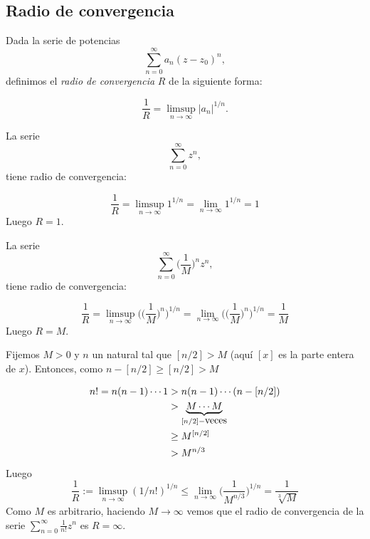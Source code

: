 \subsection{Radio de convergencia}


\begin{definicion}{} Dada la serie de potencias
\[
	\sum\limits_{n=0}^{\infty}a_n(z-z_0)^n,
\]
definimos el \emph{radio de convergencia} $R$ de la siguiente forma:



\[
\frac{1}{R}=\limsup\limits_{n\to \infty} |a_n|^{1/n}.
\]

\end{definicion}

\begin{ejemplo}{} La serie
\[
	\sum\limits_{n=0}^{\infty}z^n,
\]
tiene radio de convergencia:

\[\frac{1}{R}=\limsup\limits_{n\to \infty}1^{1/n}=\lim\limits_{n\to\infty}1^{1/n}=1\]
Luego $R=1$.
\end{ejemplo}

\begin{ejemplo}{} La serie
\[
	\sum\limits_{n=0}^{\infty}\bigg(\frac{1}{M}\bigg)^nz^n,
\]
tiene radio de convergencia:

\[\frac{1}{R}=\limsup\limits_{n\to \infty}\bigg(\bigg(\frac{1}{M}\bigg)^n\bigg)^{1/n}=\lim\limits_{n\to\infty}\bigg(\bigg(\frac{1}{M}\bigg)^n\bigg)^{1/n}=\frac1M\]
Luego $R=M$.

\end{ejemplo}

\begin{ejemplo}{} Fijemos $M>0$ y $n$ un natural tal que $[n/2] >M$ (aquí $[x]$ es la parte entera de $x$). Entonces,
como $n-[n/2]\geq [n/2]>M$

\[
\begin{split}
n!=n(n-1)\cdots 1 &> n(n-1)\cdots (n-[n/2]) \\
&>\underbrace{M\cdots M }_{[n/2]-\hbox{veces}}\\
&\geq M^{[n/2]}\\
&> M^{n/3}\\
\end{split}
\]
Luego
\[\frac{1}{R}:=\limsup_{n\to\infty} (1/n!)^{1/n}\leq \lim_{n\to\infty} \bigg(\frac{1}{M^{n/3}}\bigg)^{1/n}=\frac{1}{\sqrt[3]{M}}\]
Como $M$ es arbitrario, haciendo $M\to\infty$ vemos que el radio de convergencia de la serie  $\sum\limits_{n=0}^{\infty}\frac{1}{n!}z^n$
es $R=\infty$.
\end{ejemplo}

